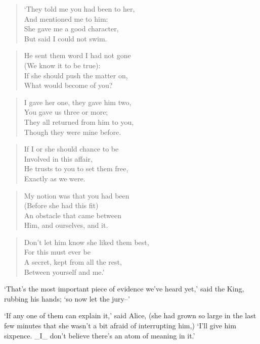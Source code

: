 \documentclass[12pt]{book}
\begin{document}
\begin{verse}
        `They told me you had been to her,\\
          And mentioned me to him:\\
        She gave me a good character,\\
          But said I could not swim.
\end{verse}
\begin{verse}
        He sent them word I had not gone\\
          (We know it to be true):\\
        If she should push the matter on,\\
          What would become of you?
\end{verse}
\begin{verse}
        I gave her one, they gave him two,\\
          You gave us three or more;\\
        They all returned from him to you,\\
          Though they were mine before.
\end{verse}
\begin{verse}
        If I or she should chance to be\\
          Involved in this affair,\\
        He trusts to you to set them free,\\
          Exactly as we were.
\end{verse}
\begin{verse}
        My notion was that you had been\\
          (Before she had this fit)\\
        An obstacle that came between\\
          Him, and ourselves, and it.
\end{verse}
\begin{verse}
        Don't let him know she liked them best,\\
          For this must ever be\\
        A secret, kept from all the rest,\\
          Between yourself and me.'
\end{verse}

  `That's the most important piece of evidence we've heard yet,'
said the King, rubbing his hands; `so now let the jury--'

  `If any one of them can explain it,' said Alice, (she had
grown so large in the last few minutes that she wasn't a bit
afraid of interrupting him,) `I'll give him sixpence.  \_I\_ don't
believe there's an atom of meaning in it.'
\end{document}
